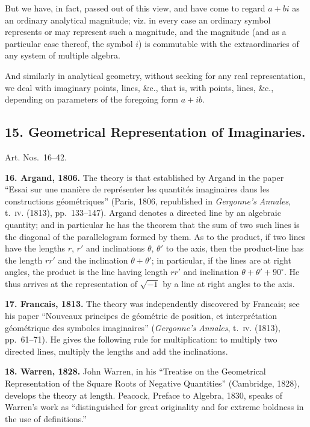 \documentclass[11pt,a4paper]{book}
\begin{document}
But we have, in fact, passed out of this view, and have come to regard $a + bi$ as an ordinary analytical magnitude; viz. in every case an ordinary symbol represents or may represent such a magnitude, and the magnitude (and as a particular case thereof, the symbol $i$) is commutable with the extraordinaries of any system of multiple algebra.

And similarly in analytical geometry, without seeking for any real representation, we deal with imaginary points, lines, \&c., that is, with points, lines, \&c., depending on parameters of the foregoing form $a + ib$.

\subsection*{15. Geometrical Representation of Imaginaries.}

Art. Nos.~16--42.

\textbf{16. Argand, 1806.} The theory is that established by Argand in the paper ``Essai sur une mani\`ere de repr\'esenter les quantit\'es imaginaires dans les constructions g\'eom\'etriques'' (Paris, 1806, republished in \textit{Gergonne's Annales}, t.~\textsc{iv}. (1813), pp.~133--147). Argand denotes a directed line by an algebraic quantity; and in particular he has the theorem that the sum of two such lines is the diagonal of the parallelogram formed by them. As to the product, if two lines have the lengths $r$, $r'$ and inclinations $\theta$, $\theta'$ to the axis, then the product-line has the length $rr'$ and the inclination $\theta + \theta'$; in particular, if the lines are at right angles, the product is the line having length $rr'$ and inclination $\theta + \theta' + 90^{\circ}$. He thus arrives at the representation of $\sqrt{-1}$ by a line at right angles to the axis.

\textbf{17. Francais, 1813.} The theory was independently discovered by Francais; see his paper ``Nouveaux principes de g\'eom\'etrie de position, et interpr\'etation g\'eom\'etrique des symboles imaginaires'' (\textit{Gergonne's Annales}, t.~\textsc{iv}. (1813), pp.~61--71). He gives the following rule for multiplication: to multiply two directed lines, multiply the lengths and add the inclinations.

\textbf{18. Warren, 1828.} John Warren, in his ``Treatise on the Geometrical Representation of the Square Roots of Negative Quantities'' (Cambridge, 1828), develops the theory at length. Peacock, Preface to Algebra, 1830, speaks of Warren's work as ``distinguished for great originality and for extreme boldness in the use of definitions.''
\end{document}
